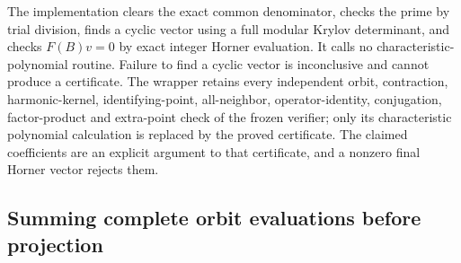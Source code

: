 \documentclass[11pt,a4paper]{article}
\theoremstyle{definition}
\begin{document}
The implementation  clears
the exact common denominator, checks the prime by trial division,
finds a cyclic vector using a full modular Krylov determinant,
and checks $F(B)v=0$ by exact integer Horner evaluation.
It calls no characteristic-polynomial routine. Failure to find
a cyclic vector is inconclusive and cannot produce a certificate.
The wrapper  retains every
independent orbit, contraction, harmonic-kernel, identifying-point,
all-neighbor, operator-identity, conjugation, factor-product and
extra-point check of the frozen verifier; only its characteristic
polynomial calculation is replaced by the proved certificate.
The claimed coefficients are an explicit argument to that
certificate, and a nonzero final Horner vector rejects them.



\subsection{Summing complete orbit evaluations before projection}
\label{sec:kt-sum-first-replay}
\end{document}
